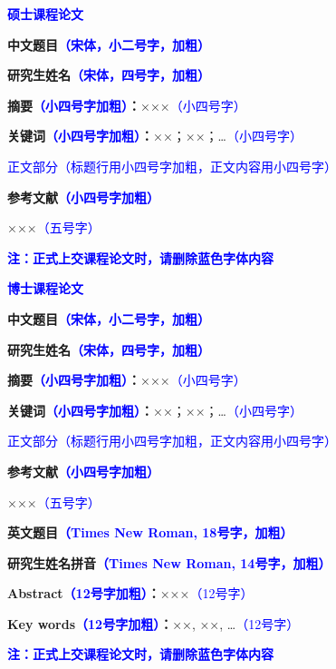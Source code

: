 \newcommand{\fmtblue}[1]{\textcolor{blue}{#1}}

{\songti\bfseries\xiaoerhao\fmtblue{硕士课程论文}\par}
{\centering\songti\bfseries\xiaoerhao 中文题目\fmtblue{（宋体，小二号字，加粗）}\par}
{\centering\songti\bfseries\sihao 研究生姓名\fmtblue{（宋体，四号字，加粗）}\par}

{\songti\xiaosihao\textbf{摘要}\fmtblue{\textbf{（小四号字加粗）}}\textbf{：}×××\fmtblue{（小四号字）}\par}
{\songti\xiaosihao\textbf{关键词}\fmtblue{\textbf{（小四号字加粗）}}\textbf{：}××；××；…\fmtblue{（小四号字）}\par}

{\songti\xiaosihao\fmtblue{正文部分（标题行用小四号字加粗，正文内容用小四号字）}\par}

{\songti\xiaosihao\textbf{参考文献}\fmtblue{\textbf{（小四号字加粗）}}\par}
{\songti\wuhao [1] ×××\fmtblue{（五号字）}\par}

{\songti\bfseries\xiaosihao\fmtblue{注：正式上交课程论文时，请删除蓝色字体内容}\par}

\clearpage
{\songti\bfseries\xiaoerhao\fmtblue{博士课程论文}\par}
{\centering\songti\bfseries\xiaoerhao 中文题目\fmtblue{（宋体，小二号字，加粗）}\par}
{\centering\songti\bfseries\sihao 研究生姓名\fmtblue{（宋体，四号字，加粗）}\par}

{\songti\xiaosihao\textbf{摘要}\fmtblue{\textbf{（小四号字加粗）}}\textbf{：}×××\fmtblue{（小四号字）}\par}
{\songti\xiaosihao\textbf{关键词}\fmtblue{\textbf{（小四号字加粗）}}\textbf{：}××；××；…\fmtblue{（小四号字）}\par}

{\songti\xiaosihao\fmtblue{正文部分（标题行用小四号字加粗，正文内容用小四号字）}\par}

{\songti\xiaosihao\textbf{参考文献}\fmtblue{\textbf{（小四号字加粗）}}\par}
{\songti\wuhao [1] ×××\fmtblue{（五号字）}\par}

{\centering\songti\bfseries\xiaoerhao 英文题目\fmtblue{（Times New Roman, 18号字，加粗）}\par}
{\centering\songti\bfseries\sihao 研究生姓名拼音\fmtblue{（Times New Roman, 14号字，加粗）}\par}
\noindent\textbf{Abstract}\fmtblue{\textbf{（12号字加粗）}}\textbf{：}×××\fmtblue{（12号字）}\par
\noindent\textbf{Key words}\fmtblue{\textbf{（12号字加粗）}}\textbf{：}××, ××, …\fmtblue{（12号字）}\par

{\songti\bfseries\xiaosihao\fmtblue{注：正式上交课程论文时，请删除蓝色字体内容}\par}
